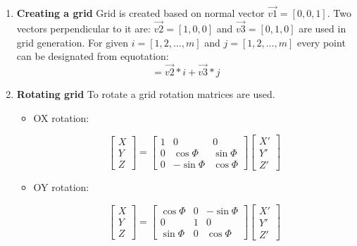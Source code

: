 \begin{enumerate}
\item \textbf{Creating a grid}
\newline Grid is created based on normal vector $\vec{v1}=[0,0,1]$. Two vectors perpendicular to it are: $\vec{v2}=[1,0,0]$ and $\vec{v3}=[0,1,0]$ are used in grid generation. For given $i = [1,2,\ldots,m] $ and $j = [1,2,\ldots,m] $ every point can be designated from equotation:
\begin{equation}
[x,y,z] = \vec{v2}*i+\vec{v3}*j
\end{equation}
\item \textbf{Rotating grid}
\newline\indent To rotate a grid rotation matrices are used.
\begin{itemize}
\item OX rotation:

\begin{equation}
\left[ \begin{array}{c} X \\ Y \\Z \end{array} \right] = \begin{bmatrix} 1 & 0 & 0 \\ 0 & \cos\Phi & \sin\Phi \\ 0 & -\sin\Phi & \cos\Phi \end{bmatrix}  \left[ \begin{array}{c} X' \\ Y' \\ Z' \end{array} \right] 
\end{equation}

\item OY rotation:

\begin{equation}
\left[ \begin{array}{c} X \\ Y \\Z \end{array} \right] = \begin{bmatrix} \cos\Phi & 0 & -\sin\Phi \\ 0 & 1 & 0 \\ \sin\Phi & 0 & \cos\Phi \end{bmatrix} \left[ \begin{array}{c} X' \\ Y' \\ Z' \end{array} \right]
\end{equation}


\end{itemize}
\end{enumerate}
